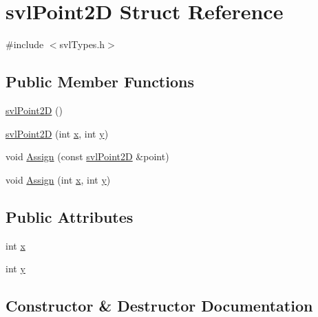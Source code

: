 \hypertarget{structsvl_point2_d}{}\section{svl\+Point2\+D Struct Reference}
\label{structsvl_point2_d}


{\ttfamily \#include $<$svl\+Types.\+h$>$}

\subsection*{Public Member Functions}
\begin{DoxyCompactItemize}
\item 
\hyperlink{structsvl_point2_d_a363ae27c4d8c6b059fa6459b1ad0f72e}{svl\+Point2\+D} ()
\item 
\hyperlink{structsvl_point2_d_a44bfe06daf764334bb1799a74b90240e}{svl\+Point2\+D} (int \hyperlink{structsvl_point2_d_a6993df11112bf2ed7acaf97215988ba7}{x}, int \hyperlink{structsvl_point2_d_a64c9c29fe5dda7ff0e2c956fc227e6c9}{y})
\item 
void \hyperlink{structsvl_point2_d_aa5a421b6bded7218a86b0523e98c3d65}{Assign} (const \hyperlink{structsvl_point2_d}{svl\+Point2\+D} \&point)
\item 
void \hyperlink{structsvl_point2_d_a53b57929e003c8a6a5fd6caba36493a8}{Assign} (int \hyperlink{structsvl_point2_d_a6993df11112bf2ed7acaf97215988ba7}{x}, int \hyperlink{structsvl_point2_d_a64c9c29fe5dda7ff0e2c956fc227e6c9}{y})
\end{DoxyCompactItemize}
\subsection*{Public Attributes}
\begin{DoxyCompactItemize}
\item 
int \hyperlink{structsvl_point2_d_a6993df11112bf2ed7acaf97215988ba7}{x}
\item 
int \hyperlink{structsvl_point2_d_a64c9c29fe5dda7ff0e2c956fc227e6c9}{y}
\end{DoxyCompactItemize}


\subsection{Constructor \& Destructor Documentation}
\hypertarget{structsvl_point2_d_a363ae27c4d8c6b059fa6459b1ad0f72e}{}
